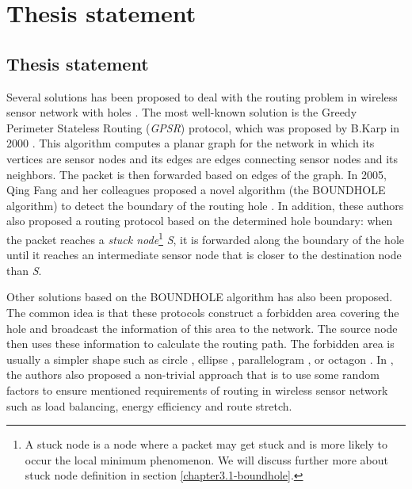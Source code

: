 \section{Thesis statement}
\subsection{Thesis statement}\label{thesis-statement}
Several solutions has been proposed to deal with the routing problem in wireless sensor network with holes \cite{gpsr,boundhole,ehds,elbar,ellipse,issnip}. The most well-known solution is the Greedy Perimeter Stateless Routing (\emph{GPSR}) protocol, which was proposed by B.Karp in 2000 \cite{gpsr}. This algorithm computes a planar graph for the network in which its vertices are sensor nodes and its edges are edges connecting sensor nodes and its neighbors. The packet is then forwarded based on edges of the graph. In 2005, Qing Fang and her colleagues proposed a novel algorithm (the BOUNDHOLE algorithm) to detect the boundary of the routing hole \cite{boundhole}. In addition, these authors also proposed a routing protocol based on the determined hole boundary: when the packet reaches a \emph{stuck node}\footnote{A stuck node is a node where a packet may get stuck and is more likely to occur the local minimum phenomenon. We will discuss further more about stuck node definition in section \ref{chapter3.1-boundhole}.} \emph{S}, it is forwarded along the boundary of the hole until it reaches an intermediate sensor node that is closer to the destination node than \emph{S}. 

Other solutions based on the BOUNDHOLE algorithm has also been proposed. The common idea is that these protocols construct a forbidden area covering the hole and broadcast the information of this area to the network. The source node then uses these information to calculate the routing path. The forbidden area is usually a simpler shape such as circle \cite{ehds}, ellipse \cite{ellipse}, parallelogram \cite{elbar}, or octagon \cite{issnip}. In \cite{issnip}, the authors also proposed a non-trivial approach that is to use some random factors to ensure mentioned requirements of routing in wireless sensor network such as load balancing, energy efficiency and route stretch.

